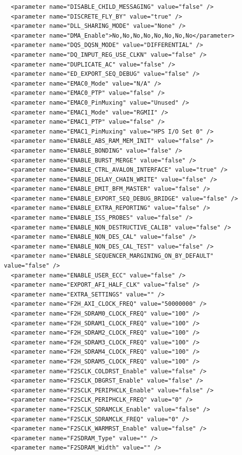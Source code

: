 \documentclass[conference]{IEEEtran}
\begin{document}
\begin{lstlisting}
  <parameter name="DISABLE_CHILD_MESSAGING" value="false" />
  <parameter name="DISCRETE_FLY_BY" value="true" />
  <parameter name="DLL_SHARING_MODE" value="None" />
  <parameter name="DMA_Enable">No,No,No,No,No,No,No,No</parameter>
  <parameter name="DQS_DQSN_MODE" value="DIFFERENTIAL" />
  <parameter name="DQ_INPUT_REG_USE_CLKN" value="false" />
  <parameter name="DUPLICATE_AC" value="false" />
  <parameter name="ED_EXPORT_SEQ_DEBUG" value="false" />
  <parameter name="EMAC0_Mode" value="N/A" />
  <parameter name="EMAC0_PTP" value="false" />
  <parameter name="EMAC0_PinMuxing" value="Unused" />
  <parameter name="EMAC1_Mode" value="RGMII" />
  <parameter name="EMAC1_PTP" value="false" />
  <parameter name="EMAC1_PinMuxing" value="HPS I/O Set 0" />
  <parameter name="ENABLE_ABS_RAM_MEM_INIT" value="false" />
  <parameter name="ENABLE_BONDING" value="false" />
  <parameter name="ENABLE_BURST_MERGE" value="false" />
  <parameter name="ENABLE_CTRL_AVALON_INTERFACE" value="true" />
  <parameter name="ENABLE_DELAY_CHAIN_WRITE" value="false" />
  <parameter name="ENABLE_EMIT_BFM_MASTER" value="false" />
  <parameter name="ENABLE_EXPORT_SEQ_DEBUG_BRIDGE" value="false" />
  <parameter name="ENABLE_EXTRA_REPORTING" value="false" />
  <parameter name="ENABLE_ISS_PROBES" value="false" />
  <parameter name="ENABLE_NON_DESTRUCTIVE_CALIB" value="false" />
  <parameter name="ENABLE_NON_DES_CAL" value="false" />
  <parameter name="ENABLE_NON_DES_CAL_TEST" value="false" />
  <parameter name="ENABLE_SEQUENCER_MARGINING_ON_BY_DEFAULT" value="false" />
  <parameter name="ENABLE_USER_ECC" value="false" />
  <parameter name="EXPORT_AFI_HALF_CLK" value="false" />
  <parameter name="EXTRA_SETTINGS" value="" />
  <parameter name="F2H_AXI_CLOCK_FREQ" value="50000000" />
  <parameter name="F2H_SDRAM0_CLOCK_FREQ" value="100" />
  <parameter name="F2H_SDRAM1_CLOCK_FREQ" value="100" />
  <parameter name="F2H_SDRAM2_CLOCK_FREQ" value="100" />
  <parameter name="F2H_SDRAM3_CLOCK_FREQ" value="100" />
  <parameter name="F2H_SDRAM4_CLOCK_FREQ" value="100" />
  <parameter name="F2H_SDRAM5_CLOCK_FREQ" value="100" />
  <parameter name="F2SCLK_COLDRST_Enable" value="false" />
  <parameter name="F2SCLK_DBGRST_Enable" value="false" />
  <parameter name="F2SCLK_PERIPHCLK_Enable" value="false" />
  <parameter name="F2SCLK_PERIPHCLK_FREQ" value="0" />
  <parameter name="F2SCLK_SDRAMCLK_Enable" value="false" />
  <parameter name="F2SCLK_SDRAMCLK_FREQ" value="0" />
  <parameter name="F2SCLK_WARMRST_Enable" value="false" />
  <parameter name="F2SDRAM_Type" value="" />
  <parameter name="F2SDRAM_Width" value="" />

\end{lstlisting}
\end{document}
